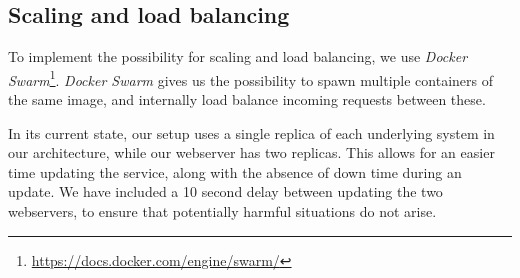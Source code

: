 \subsection{Scaling and load balancing}
To implement the possibility for scaling and load balancing, we use \textit{Docker Swarm}\footnote{\url{https://docs.docker.com/engine/swarm/}}. \textit{Docker Swarm} gives us the possibility to spawn multiple containers of the same image, and internally load balance incoming requests between these.

In its current state, our setup uses a single replica of each underlying system in our architecture, while our webserver has two replicas. This allows for an easier time updating the service, along with the absence of down time during an update. We have included a 10 second delay between updating the two webservers, to ensure that potentially harmful situations do not arise. 